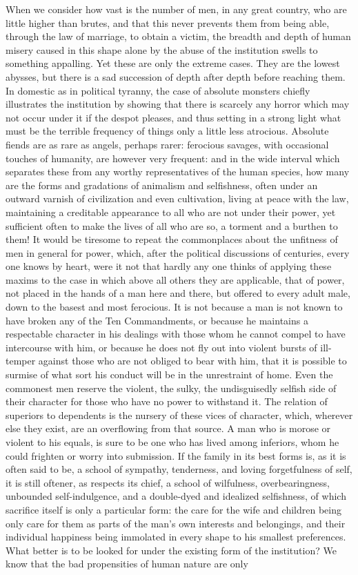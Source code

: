 \documentclass[12pt]{report}
\begin{document}
When we consider how vast is the number of men, in any great country, who are little higher than brutes, and that this never prevents them from being able, through the law of marriage, to obtain a victim, the breadth and depth of human misery caused in this shape alone by the abuse of the institution swells to something appalling. Yet these are only the extreme cases. They are the lowest abysses, but there is a sad succession of depth after depth before reaching them. In domestic as in political tyranny, the case of absolute monsters chiefly illustrates the institution by showing that there is scarcely any horror which may not occur under it if the despot pleases, and thus setting in a strong light what must be the terrible frequency of things only a little less atrocious. Absolute fiends are as rare as angels, perhaps rarer: ferocious savages, with occasional touches of humanity, are however very frequent: and in the wide interval which separates these from any worthy representatives of the human species, how many are the forms and gradations of animalism and selfishness, often under an outward varnish of civilization and even cultivation, living at peace with the law, maintaining a creditable appearance to all who are not under their power, yet sufficient often to make the lives of all who are so, a torment and a burthen to them! It would be tiresome to repeat the commonplaces about the unfitness of men in general for power, which, after the political discussions of centuries, every one knows by heart, were it not that hardly any one thinks of applying these maxims to the case in which above all others they are applicable, that of power, not placed in the hands of a man here and there, but offered to every adult male, down to the basest and most ferocious. It is not because a man is not known to have broken any of the Ten Commandments, or because he maintains a respectable character in his dealings with those whom he cannot compel to have intercourse with him, or because he does not fly out into violent bursts of ill-temper against those who are not obliged to bear with him, that it is possible to surmise of what sort his conduct will be in the unrestraint of home. Even the commonest men reserve the violent, the sulky, the undisguisedly selfish side of their character for those who have no power to withstand it. The relation of superiors to dependents is the nursery of these vices of character, which, wherever else they exist, are an overflowing from that source. A man who is morose or violent to his equals, is sure to be one who has lived among inferiors, whom he could frighten or worry into submission. If the family in its best forms is, as it is often said to be, a school of sympathy, tenderness, and loving forgetfulness of self, it is still oftener, as respects its chief, a school of wilfulness, overbearingness, unbounded self-indulgence, and a double-dyed and idealized selfishness, of which sacrifice itself is only a particular form: the care for the wife and children being only care for them as parts of the man's own interests and belongings, and their individual happiness being immolated in every shape to his smallest preferences. What better is to be looked for under the existing form of the institution? We know that the bad propensities of human nature are only 
\end{document}
